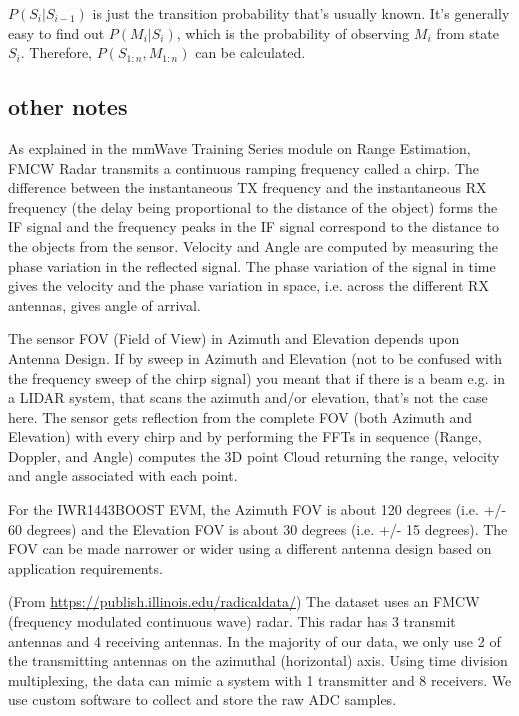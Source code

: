 \documentclass[11pt, oneside]{article}   	%
\begin{document}
$P(S_i|S_{i-1})$ is just the transition probability that's usually known. It's generally easy to find out $P(M_i|S_i)$, which is the probability of observing $M_i$ from state $S_i$. Therefore, $P(S_{1:n}, M_{1:n})$ can be calculated.

\subsection{other notes}

As explained in the mmWave Training Series module on Range Estimation, FMCW Radar transmits a continuous ramping frequency called a chirp. The difference between the instantaneous TX frequency and the instantaneous RX frequency (the delay being proportional to the distance of the object) forms the IF signal and the frequency peaks in the IF signal correspond to the distance to the objects from the sensor. Velocity and Angle are computed by measuring the phase variation in the reflected signal. The phase variation of the signal in time gives the velocity and the phase variation in space, i.e. across the different RX antennas, gives angle of arrival.

The sensor FOV (Field of View) in Azimuth and Elevation depends upon Antenna Design. If by sweep in Azimuth and Elevation (not to be confused with the frequency sweep of the chirp signal) you meant that if there is a beam e.g. in a LIDAR system, that scans the azimuth and/or elevation, that's not the case here. The sensor gets reflection from the complete FOV (both Azimuth and Elevation) with every chirp and by performing the FFTs in sequence (Range, Doppler, and Angle) computes the 3D point Cloud returning the range, velocity and angle associated with each point.

For the IWR1443BOOST EVM, the Azimuth FOV is about 120 degrees (i.e. +/- 60 degrees) and the Elevation FOV is about 30 degrees (i.e. +/- 15 degrees). The FOV can be made narrower or wider using a different antenna design based on application requirements.


(From \url{https://publish.illinois.edu/radicaldata/}) The dataset uses an FMCW (frequency modulated continuous wave) radar. This radar has 3 transmit antennas and 4 receiving antennas. In the majority of our data, we only use 2 of the transmitting antennas on the azimuthal (horizontal) axis. Using time division multiplexing, the data can mimic a system with 1 transmitter and 8 receivers. We use custom software to collect and store the raw ADC samples.
\end{document}

